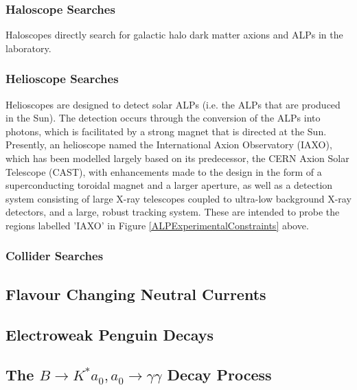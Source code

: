 \subsubsection{Haloscope Searches}
Haloscopes directly search for galactic halo dark matter axions and ALPs in the laboratory. 
\subsubsection{Helioscope Searches}
Helioscopes are designed to detect solar ALPs (i.e. the ALPs that are produced in the Sun). The detection occurs through the conversion of the ALPs into photons, which is facilitated by a strong magnet that is directed at the Sun.
Presently, an helioscope named the International Axion Observatory (IAXO), which has been modelled largely based on its predecessor, the CERN Axion Solar Telescope (CAST), with enhancements made to the design in the form of a superconducting
toroidal magnet and a larger aperture, as well as a detection system consisting of large X-ray telescopes coupled to ultra-low background X-ray detectors, and a large, robust tracking system. These are intended to probe the regions labelled 'IAXO'
in Figure \ref{ALPExperimentalConstraints} above.
\subsubsection{Collider Searches}                                                                                     
\subsection{Flavour Changing Neutral Currents} 

\subsection{Electroweak Penguin Decays}
\subsection{The $B\rightarrow K^{*}a_{0}, a_{0}\rightarrow\gamma\gamma$ Decay Process}

